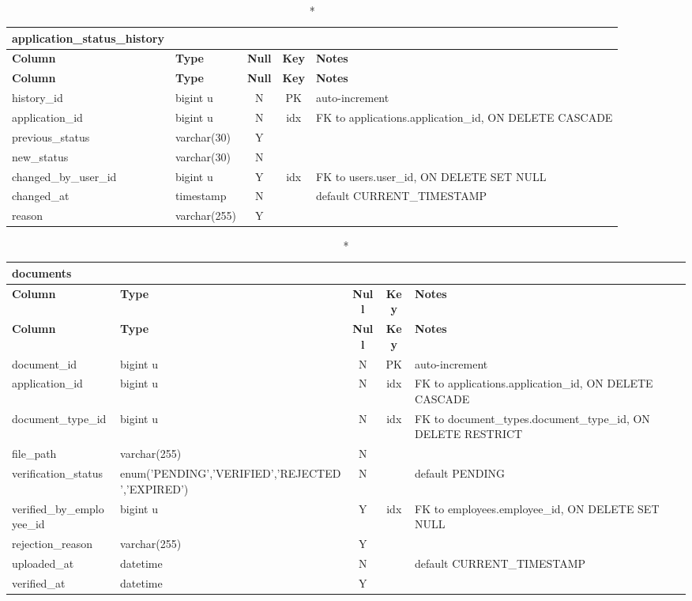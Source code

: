 \begin{longtable}{@{}p{3.4cm}p{2.9cm}c c p{5.6cm}@{}}
\caption*{\textbf{application\_\allowbreak{}status\_\allowbreak{}history}}\\
\toprule \textbf{Column} & \textbf{Type} & \textbf{Null} & \textbf{Key} & \textbf{Notes} \\ \midrule \endfirsthead
\toprule \textbf{Column} & \textbf{Type} & \textbf{Null} & \textbf{Key} & \textbf{Notes} \\ \midrule \endhead
\bottomrule \endlastfoot
history\_\allowbreak{}id & bigint u & N & PK & auto-increment \\
application\_\allowbreak{}id & bigint u & N & idx & FK to applications.application\_\allowbreak{}id, ON DELETE CASCADE \\
previous\_\allowbreak{}status & varchar(30) & Y &  &  \\
new\_\allowbreak{}status & varchar(30) & N &  &  \\
changed\_\allowbreak{}by\_\allowbreak{}user\_\allowbreak{}id & bigint u & Y & idx & FK to users.user\_\allowbreak{}id, ON DELETE SET NULL \\
changed\_\allowbreak{}at & timestamp & N &  & default CURRENT\_\allowbreak{}TIMESTAMP \\
reason & varchar(255) & Y &  &  \\
\end{longtable}
\vspace{-0.4em}
\begin{longtable}{@{}p{3.4cm}p{2.9cm}c c p{5.6cm}@{}}
\caption*{\textbf{documents}}\\
\toprule \textbf{Column} & \textbf{Type} & \textbf{Null} & \textbf{Key} & \textbf{Notes} \\ \midrule \endfirsthead
\toprule \textbf{Column} & \textbf{Type} & \textbf{Null} & \textbf{Key} & \textbf{Notes} \\ \midrule \endhead
\bottomrule \endlastfoot
document\_\allowbreak{}id & bigint u & N & PK & auto-increment \\
application\_\allowbreak{}id & bigint u & N & idx & FK to applications.application\_\allowbreak{}id, ON DELETE CASCADE \\
document\_\allowbreak{}type\_\allowbreak{}id & bigint u & N & idx & FK to document\_\allowbreak{}types.document\_\allowbreak{}type\_\allowbreak{}id, ON DELETE RESTRICT \\
file\_\allowbreak{}path & varchar(255) & N &  &  \\
verification\_\allowbreak{}status & enum('PENDING',\allowbreak{}'VERIFIED',\allowbreak{}'REJECTED',\allowbreak{}'EXPIRED') & N &  & default PENDING \\
verified\_\allowbreak{}by\_\allowbreak{}employee\_\allowbreak{}id & bigint u & Y & idx & FK to employees.employee\_\allowbreak{}id, ON DELETE SET NULL \\
rejection\_\allowbreak{}reason & varchar(255) & Y &  &  \\
uploaded\_\allowbreak{}at & datetime & N &  & default CURRENT\_\allowbreak{}TIMESTAMP \\
verified\_\allowbreak{}at & datetime & Y &  &  \\
\end{longtable}
